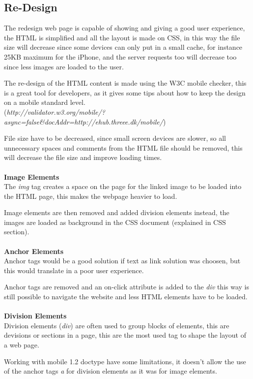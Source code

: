 \subsection{Re-Design}

The redesign web page is capable of showing and giving a good user experience, the HTML is simplified and all the layout is made on CSS, in this way the file size will decrease  since some devices can only put in a small cache, for instance 25KB maximum for the iPhone, and the server requests too will decrease too since less images are loaded to the user.

The re-design of the HTML content is made using the W3C mobile checker, this is a great tool for developers, as it gives some tips about how to keep the design on a mobile standard level. \\(\textit{http://validator.w3.org/mobile/?async=false\&docAddr=http://ehub.threee.dk/mobile/})

File size have to be decreased, since small screen devices are slower, so all unnecessary spaces and comments from the HTML file should be removed, this will decrease the file size and improve loading times.
\\\\
\textbf{Image Elements}\\
The \textit{img} tag creates a space on the page for the linked image to be loaded into the HTML page, this makes the webpage heavier to load.

Image elements are then removed and added division elements instead, the images are loaded as background in the CSS document (explained in CSS section).
\\\\
\textbf{Anchor Elements}\\
Anchor tags would be a good solution if text as link solution was choosen, but this would translate in a poor user experience. 

Anchor tags are removed and an on-click attribute is added to the \textit{div} this way is still possible to navigate the website and less HTML elements have to be loaded. 
\\\\
\textbf{Division Elements}\\
Division elements (\textit{div}) are often used to group blocks of elements, this are devisions or sections in a page, this are the most used tag to shape the layout of a web page.

Working with mobile 1.2 doctype have some limitations, it doesn't allow the use of the anchor tags \textit{a} for division elements as it was for image elements.

